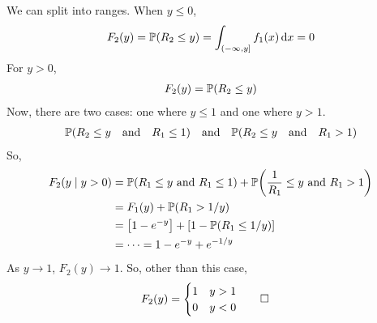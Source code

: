 \begin{solution}
    We can split into ranges. When $y \le 0$,
    \begin{align}
        F_2(y) = \mathbb{P}(R_2 \le y) = \int_{(-\infty,y]} f_1(x) \dd{x} = 0
    \end{align}
    For $y > 0$,
    \begin{align}
        F_2(y) = \mathbb{P}(R_2 \le y)
    \end{align}
    Now, there are two cases: one where $y \le 1$ and one where $y > 1$.
    \begin{align}
        \probability(R_2 \le y \qand R_1 \le 1) \qand \probability(R_2 \le y \qand R_1 > 1)
    \end{align}
    So,
    \begin{align}
        F_2(y \mid y > 0) &= \mathbb{P}(R_1 \le y \text{ and } R_1 \le 1) + \mathbb{P}\qty(\frac{1}{R_1} \le y \text{ and } R_1 > 1)\\
        &= F_1(y) + \mathbb{P}(R_1 > 1/y)\\
        &= \left[ 1 - e^{-y} \right] + \left[ 1 - \mathbb{P}(R_1 \le 1/y) \right]\\
        &= \cdots = 1 - e^{-y} + e^{-1/y}
    \end{align}
    As $y \to 1$, $F_2(y) \to 1$. So, other than this case,
    \begin{align}
        F_2(y) = \begin{cases}
            1 & y > 1\\
            0 & y < 0
        \end{cases} & \qedhere
    \end{align}
\end{solution}

